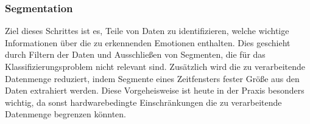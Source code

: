\subsubsection{Segmentation} \label{segmentation-0}

Ziel dieses Schrittes ist es, Teile von Daten zu identifizieren, welche wichtige Informationen {\"u}ber die zu erkennenden Emotionen enthalten. 
Dies geschieht durch Filtern der Daten und Ausschlie{\ss}en von Segmenten, die f{\"u}r das Klassifizierungsproblem nicht relevant sind.
Zus{\"a}tzlich wird die zu verarbeitende Datenmenge reduziert, indem Segmente eines Zeitfensters fester Gr{\"o}{\ss}e aus den Daten extrahiert werden.
Diese Vorgeheisweise ist heute in der Praxis besonders wichtig, da sonst hardwarebedingte Einschr{\"a}nkungen die zu verarbeitende Datenmenge begrenzen k{\"o}nnten. \\